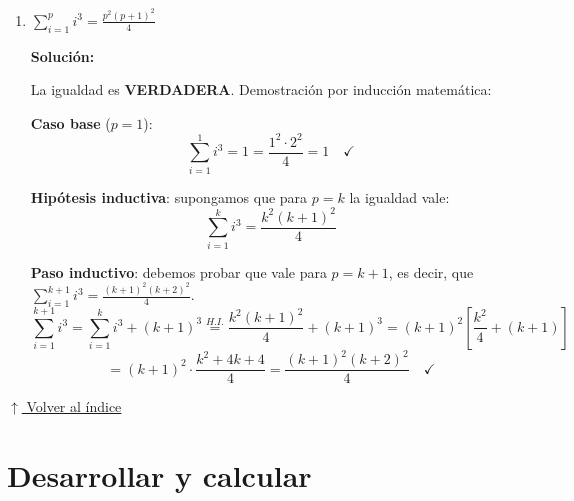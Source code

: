 \documentclass[12pt]{article}
\newcommand{\solucion}{%
    \vspace{0.8em}%
    \textbf{Solución:}%
}
\newcommand{\volverindice}{%
    \vspace{1em}%
    \begin{flushright}%
        \hyperlink{indice}{\small $\uparrow$ Volver al índice}%
    \end{flushright}%
}
\begin{document}
\begin{enumerate}[label=\alph*.-]
    \newpage
    \item $\displaystyle\sum_{i=1}^{p} i^3 = \frac{p^2(p+1)^2}{4}$

    \solucion

    La igualdad es \textbf{VERDADERA}. Demostración por inducción matemática:

    \textbf{Caso base} ($p=1$):
    \[
    \sum_{i=1}^{1} i^3 = 1 = \frac{1^2\cdot2^2}{4} = 1 \quad \checkmark
    \]

    \textbf{Hipótesis inductiva}: supongamos que para $p=k$ la igualdad vale:
    \[
    \sum_{i=1}^{k} i^3 = \frac{k^2(k+1)^2}{4}
    \]

    \textbf{Paso inductivo}: debemos probar que vale para $p=k+1$, es decir, que
    $\displaystyle\sum_{i=1}^{k+1} i^3 = \frac{(k+1)^2(k+2)^2}{4}$.
    \[
    \sum_{i=1}^{k+1} i^3 = \sum_{i=1}^{k} i^3 + (k+1)^3
    \overset{H.I.}{=} \frac{k^2(k+1)^2}{4} + (k+1)^3
    = (k+1)^2\left[\frac{k^2}{4} + (k+1)\right]
    \]
    \[
    = (k+1)^2\cdot\frac{k^2+4k+4}{4}
    = \frac{(k+1)^2(k+2)^2}{4} \quad \checkmark
    \]

\end{enumerate}

\volverindice
\newpage

\section{Desarrollar y calcular}
\end{document}
